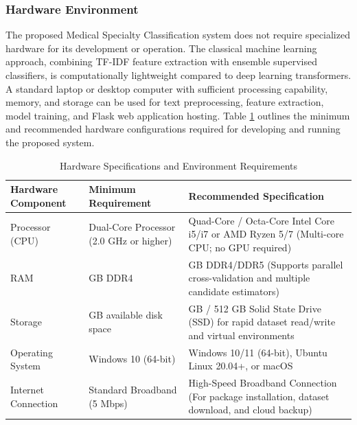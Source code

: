 \clearpage

\subsubsection{Hardware Environment}
The proposed Medical Specialty Classification system does not require specialized hardware for its development or operation. The classical machine learning approach, combining TF-IDF feature extraction with ensemble supervised classifiers, is computationally lightweight compared to deep learning transformers. A standard laptop or desktop computer with sufficient processing capability, memory, and storage can be used for text preprocessing, feature extraction, model training, and Flask web application hosting. Table \ref{tab:hardware_environment} outlines the minimum and recommended hardware configurations required for developing and running the proposed system.

\begin{table}[H]
\centering
\small
\renewcommand{\arraystretch}{1.15}
\setlength{\tabcolsep}{5pt}
\begin{tabularx}{\linewidth}{|>{\raggedright\arraybackslash}p{3.5cm}|>{\raggedright\arraybackslash}p{4.2cm}|>{\raggedright\arraybackslash}X|}
\hline
\textbf{Hardware Component} & \textbf{Minimum Requirement} & \textbf{Recommended Specification} \\
\hline
Processor (CPU) & Dual-Core Processor (2.0 GHz or higher) & Quad-Core / Octa-Core Intel Core i5/i7 or AMD Ryzen 5/7 (Multi-core CPU; no GPU required) \\
\hline
RAM & 8 GB DDR4 & 16 GB DDR4/DDR5 (Supports parallel cross-validation and multiple candidate estimators) \\
\hline
Storage & 20 GB available disk space & 256 GB / 512 GB Solid State Drive (SSD) for rapid dataset read/write and virtual environments \\
\hline
Operating System & Windows 10 (64-bit) & Windows 10/11 (64-bit), Ubuntu Linux 20.04+, or macOS \\
\hline
Internet Connection & Standard Broadband (5 Mbps) & High-Speed Broadband Connection (For package installation, dataset download, and cloud backup) \\
\hline
\end{tabularx}
\caption{Hardware Specifications and Environment Requirements}
\label{tab:hardware_environment}
\end{table}


